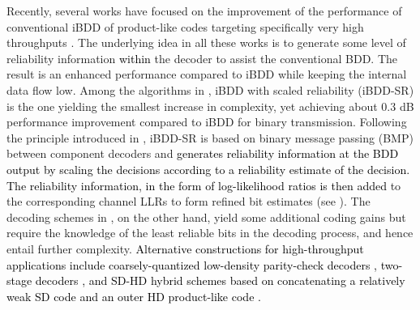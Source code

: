 \documentclass[journal]{IEEEtran}
\newcommand{\GL}{\textcolor{black}}
\newcommand{\AG}{\textcolor{black}}
\begin{document}
Recently, several works have focused on the improvement of the performance of conventional iBDD of product-like codes  targeting specifically very high throughputs \cite{Hag18,sheikhTCOM19,She18b,She19,YibitTCOM}. The underlying idea in all these works is to generate some level of reliability information \GL{within} the decoder to assist the conventional BDD. The result is an enhanced performance compared to iBDD while keeping the internal data flow low. Among the algorithms in  \cite{Hag18,sheikhTCOM19,YibitTCOM}, iBDD with scaled reliability (iBDD-SR) \cite{sheikhTCOM19} is the one yielding the smallest increase in complexity, yet achieving about $0.3$ dB performance improvement compared to iBDD for binary transmission. 
Following the principle introduced in \cite{Lech12}, iBDD-SR is based on binary message passing (BMP) between component decoders and \AG{generates reliability information at the BDD output by scaling the decisions according to a reliability estimate of the decision. The reliability information, in the form of log-likelihood ratios is then added} to the corresponding channel LLRs to form refined bit estimates (see \cite[Fig.~2]{sheikhTCOM19}). The decoding schemes in \cite{She18b,She19,YibitTCOM,GabrieleSABMSR2019}, on the other hand, yield some additional coding gains but require the knowledge of the least reliable bits in the decoding process, and hence entail further complexity. \GL{Alternative constructions for high-throughput applications include coarsely-quantized low-density parity-check decoders \cite{Lech12,Ben18,Ste19}, two-stage decoders \cite{Montorsi2018}, and SD-HD hybrid schemes based on concatenating a relatively weak SD code and an outer HD product-like code \cite{Ksch17,Ksch18}.}
\end{document}
